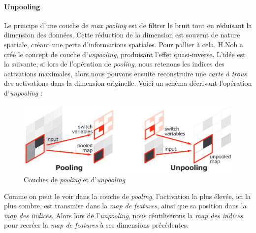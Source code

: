 \documentclass[a4paper, 11pt]{report}
\begin{document}
\paragraph{Unpooling}
Le principe d'une couche de \emph{max pooling} est de filtrer le bruit tout en réduisant la dimension des données. Cette réduction de la dimension est souvent de nature spatiale, créant une perte d'informations spatiales.
Pour pallier à cela, H.Noh a créé le concept de couche d'\emph{unpooling}, produisant l'effet quasi-inverse.
L'idée est la suivante, si lors de l'opération de \emph{pooling}, nous retenons les indices des activations maximales, alors nous pouvons ensuite reconstruire une \emph{carte à trous} des activations dans la dimension originelle.
Voici un schéma décrivant l'opération d'\emph{unpooling} :
\begin{figure}[H]
	\centering
	\includegraphics[scale=0.3]{Images/Unpooling.png}
	\caption{Couches de \emph{pooling} et d'\emph{unpooling}}
\end{figure}
Comme on peut le voir dans la couche de \emph{pooling}, l'activation la plus élevée, ici la plus sombre, est transmise dans la \emph{map de features}, ainsi que sa position dans la \emph{map des indices}. Alors lors de l'\emph{unpooling}, nous réutiliserons la \emph{map des indices} pour recréer la \emph{map de features} à ses dimensions précédentes.
\end{document}
